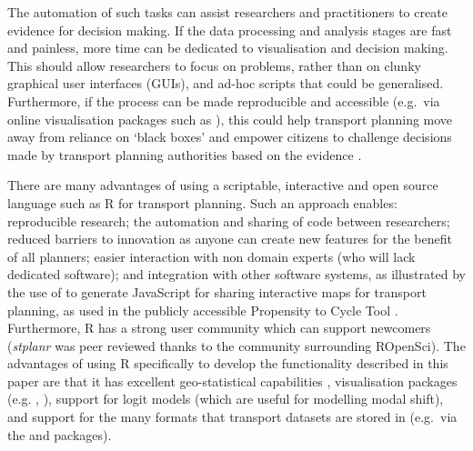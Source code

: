 The automation of such tasks can assist researchers and practitioners to
create evidence for decision making. If the data processing and analysis
stages are fast and painless, more time can be dedicated to
visualisation and decision making. This should allow researchers to
focus on problems, rather than on
clunky graphical user interfaces (GUIs), and ad-hoc scripts that could
be generalised. Furthermore, if the process can be made reproducible and
accessible (e.g.~via online visualisation packages such as
), this could help transport
planning move away from reliance on `black boxes'
\citep{waddell_urbansim:_2002} and empower citizens to
challenge decisions made by transport planning authorities based on the evidence \citep{hollander_transport_2016}.

There are many advantages of using a scriptable, interactive and open source
language such as R for transport planning.
Such an approach enables:
reproducible research; the automation and sharing of
code between researchers;
reduced barriers to innovation as anyone can create new features for the benefit of all planners;
easier interaction with non domain experts (who will lack dedicated software);
and integration with other
software systems, as illustrated by the use of 
to generate JavaScript for sharing interactive maps for transport planning,
as used in the publicly accessible Propensity to Cycle Tool \citep{lovelace_propensity_2017}.
Furthermore, R has a strong user community which can support newcomers
(\emph{stplanr} was peer reviewed thanks to the community surrounding ROpenSci).
The advantages of using R specifically to develop the
functionality described in this paper are that it has excellent
geo-statistical capabilities \citep{pebesma_software_2015},
visualisation packages (e.g. , ),
support for logit models (which are useful for modelling modal shift),
and support for the many formats that transport datasets are stored in (e.g.~via the
 and  packages).

